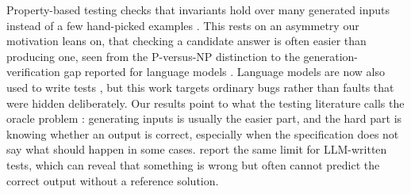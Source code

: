 \documentclass{article}
\begin{document}
Property-based testing checks that invariants hold over many generated inputs
instead of a few hand-picked examples \citep{claessen2000, maciver2019}. This
rests on an asymmetry our motivation leans on, that checking a candidate answer
is often easier than producing one, seen from the P-versus-NP distinction to the
generation-verification gap reported for language models \citep{davidson2026}.
Language models are now also used to write tests \citep{chen2022,
alshahwan2024}, but this work targets ordinary bugs rather than faults that were
hidden deliberately. Our results point to what the testing literature calls the
oracle problem \citep{barr2015}: generating inputs is usually the easier part,
and the hard part is knowing whether an output is correct, especially when the
specification does not say what should happen in some cases. \citet{prasad2025}
report the same limit for LLM-written tests, which can reveal that something is
wrong but often cannot predict the correct output without a reference solution.



\appendix










\end{document}
